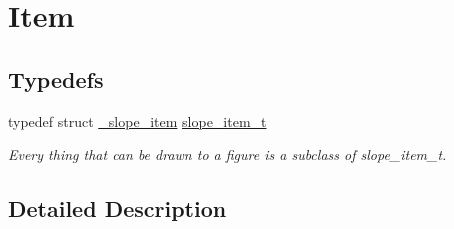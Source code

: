 \hypertarget{group__Item}{\section{Item}
\label{group__Item}
}
\subsection*{Typedefs}
\begin{DoxyCompactItemize}
\item 
\hypertarget{group__Item_ga2616141f0e164a876049da51ea3a8646}{typedef struct \hyperlink{struct__slope__item}{\+\_\+slope\+\_\+item} \hyperlink{group__Item_ga2616141f0e164a876049da51ea3a8646}{slope\+\_\+item\+\_\+t}}\label{group__Item_ga2616141f0e164a876049da51ea3a8646}

\begin{DoxyCompactList}\small\item\em Every thing that can be drawn to a figure is a subclass of slope\+\_\+item\+\_\+t. \end{DoxyCompactList}\end{DoxyCompactItemize}


\subsection{Detailed Description}
